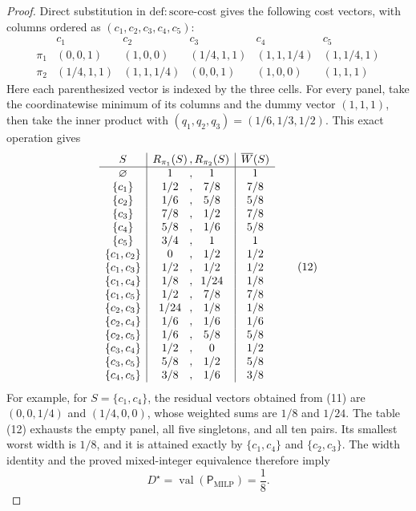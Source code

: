 \documentclass{article}
\begin{document}
\begin{proof}
Direct substitution in \(\mathrm{def{:}score\text{-}cost}\) gives the
following cost vectors, with columns ordered as
\((c_1,c_2,c_3,c_4,c_5)\):
\[
\begin{array}{c|ccccc}
&c_1&c_2&c_3&c_4&c_5\\ \hline
\pi_1&(0,0,1)&(1,0,0)&(1/4,1,1)&(1,1,1/4)&(1,1/4,1)\\
\pi_2&(1/4,1,1)&(1,1,1/4)&(0,0,1)&(1,0,0)&(1,1,1)
\end{array}                                                            \tag{11}
\]
Here each parenthesized vector is indexed by the three cells.  For every
panel, take the coordinatewise minimum of its columns and the dummy vector
\((1,1,1)\), then take the inner product with
\((q_1,q_2,q_3)=(1/6,1/3,1/2)\).  This exact operation gives
\[
\begin{array}{c|c@{\,,\,}c|c}
S&R_{\pi_1}(S)&R_{\pi_2}(S)&\overline W(S)\\ \hline
\varnothing&1&1&1\\
\{c_1\}&1/2&7/8&7/8\\
\{c_2\}&1/6&5/8&5/8\\
\{c_3\}&7/8&1/2&7/8\\
\{c_4\}&5/8&1/6&5/8\\
\{c_5\}&3/4&1&1\\
\{c_1,c_2\}&0&1/2&1/2\\
\{c_1,c_3\}&1/2&1/2&1/2\\
\{c_1,c_4\}&1/8&1/24&1/8\\
\{c_1,c_5\}&1/2&7/8&7/8\\
\{c_2,c_3\}&1/24&1/8&1/8\\
\{c_2,c_4\}&1/6&1/6&1/6\\
\{c_2,c_5\}&1/6&5/8&5/8\\
\{c_3,c_4\}&1/2&0&1/2\\
\{c_3,c_5\}&5/8&1/2&5/8\\
\{c_4,c_5\}&3/8&1/6&3/8
\end{array}                                                            \tag{12}
\]
For example, for \(S=\{c_1,c_4\}\), the residual vectors obtained from
(11) are \((0,0,1/4)\) and \((1/4,0,0)\), whose weighted sums are
\(1/8\) and \(1/24\).  The table (12) exhausts the empty panel, all five
singletons, and all ten pairs.  Its smallest worst width is \(1/8\), and
it is attained exactly by \(\{c_1,c_4\}\) and
\(\{c_2,c_3\}\).  The width identity and the proved mixed-integer
equivalence therefore imply
\[
D^\star=\operatorname{val}(\mathsf P_{\mathrm{MILP}})=\frac18.         \tag{13}
\]


\end{proof}
\end{document}
